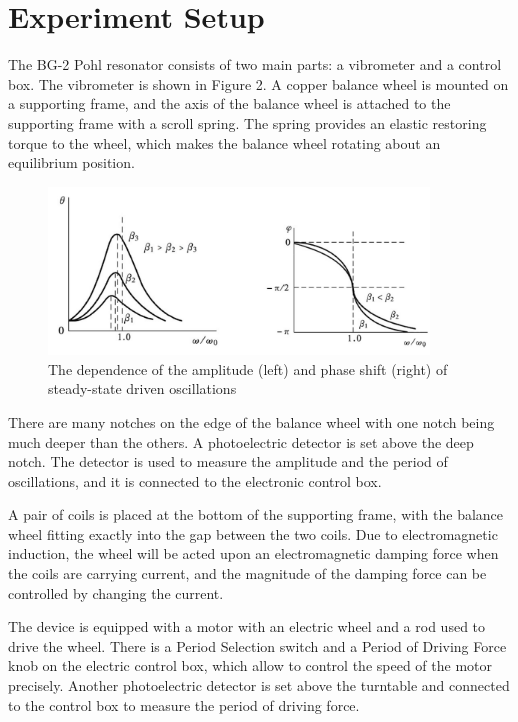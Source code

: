\section{Experiment Setup}

The BG-2 Pohl resonator consists of two main parts: a vibrometer and a control
box. The vibrometer is shown in Figure 2. A copper balance wheel is mounted on a
supporting frame, and the axis of the balance wheel is attached to the
supporting frame with a scroll spring. The spring provides an elastic restoring
torque to the wheel, which makes the balance wheel rotating about an equilibrium
position. 

\begin{figure}[H]
\centering
\includegraphics[width=0.9\textwidth]{fig/es1}
\caption{The dependence of the amplitude (left) and phase shift (right) of
  steady-state driven oscillations}
\label{aps} 
\end{figure}

There are many notches on the edge of the balance wheel with one notch being
much deeper than the others. A photoelectric detector is set above the deep
notch. The detector is used to measure the amplitude and the period of
oscillations, and it is connected to the electronic control box. 

A pair of coils is placed at the bottom of the supporting frame, with the
balance wheel fitting exactly into the gap between the two coils. Due to
electromagnetic induction, the wheel will be acted upon an electromagnetic
damping force when the coils are carrying current, and the magnitude of the
damping force can be controlled by changing the current. 

The device is equipped with a motor with an electric wheel and a rod used to
drive the wheel.
There is a Period Selection switch and a Period of Driving Force knob on the
electric control box, which allow to control the speed of the motor precisely. 
Another photoelectric detector is set above the turntable and connected to the
control box to measure the period of driving force. 

